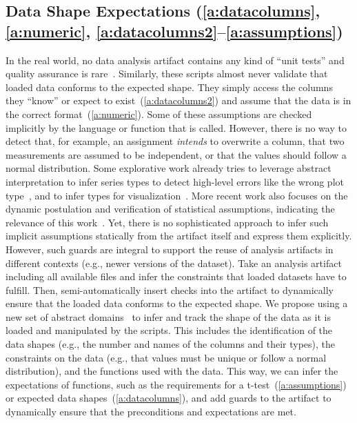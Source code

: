 \subsection{Data Shape Expectations (\ref{a:datacolumns}, \ref{a:numeric}, \ref{a:datacolumns2}--\ref{a:assumptions})}\label{sec:data-shape-expectations}
In the real world, no data analysis artifact contains any kind of \enquote{unit tests} and quality assurance is rare~\cite{DBLP:conf/msr/SihlerPSTDD24,DBLP:journals/rjour/Vidoni21}. Similarly, these scripts almost never validate that loaded data conforms to the expected shape.
They simply access the columns they \enquote{know} or expect to exist~(\ref{a:datacolumns2}) and assume that the data is in the correct format~(\ref{a:numeric}).
Some of these assumptions are checked implicitly by the language or function that is called. %
However, there is no way to detect that, for example, an assignment \textit{intends} to overwrite a column, that two measurements are assumed to be independent, or that the values should follow a normal distribution.
Some explorative work already tries to leverage abstract interpretation to infer series types to detect high-level errors like the wrong plot type~\cite{10.1145/3689609.3689996}, and to infer types for visualization~\cite{DBLP:conf/kbse/XiaLBC024}. More recent work also focuses on the dynamic postulation and verification of statistical assumptions, indicating the relevance of this work~\cite{10.1145/3729391}. Yet, there is no sophisticated approach to infer such implicit assumptions statically from the artifact itself and express them explicitly.
However, such guards are integral to support the reuse of analysis artifacts in different contexts (e.g., newer versions of the dataset).
Take an analysis artifact including all available files and infer the constraints that loaded datasets have to fulfill. %
Then, semi-automatically insert checks into the artifact to dynamically ensure that the loaded data conforms to the expected shape.
We propose using a new set of abstract domains~\cite{cousot2021principles} to infer and track the shape of the data as it is loaded and manipulated by the scripts.
This includes the identification of the data shapes (e.g., the number and names of the columns and their types), the constraints on the data (e.g., that values must be unique or follow a normal distribution), and the functions used with the data.
This way, we can infer the expectations of functions, such as the requirements for a t-test~(\ref{a:assumptions}) or expected data shapes~(\ref{a:datacolumns}), and add guards to the artifact to dynamically ensure that the preconditions and expectations are met.
